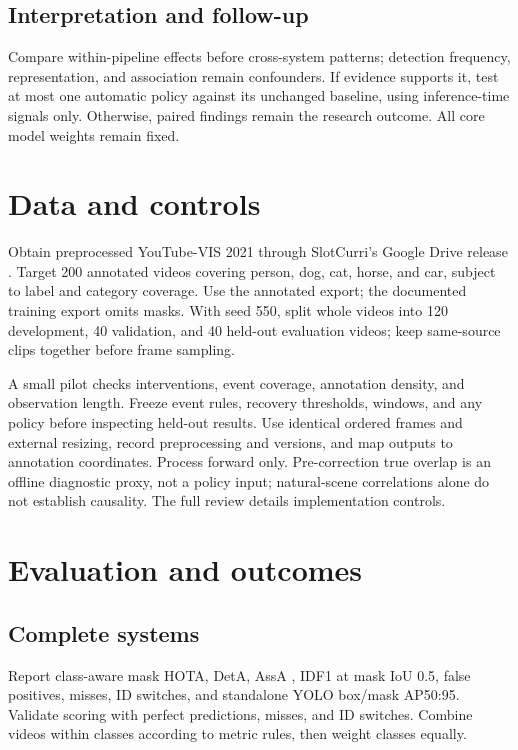 \documentclass{article}
\begin{document}
\subsection{Interpretation and follow-up}

Compare within-pipeline effects before cross-system patterns; detection frequency, representation, and association remain confounders. If evidence supports it, test at most one automatic policy against its unchanged baseline, using inference-time signals only. Otherwise, paired findings remain the research outcome. All core model weights remain fixed.

\section{Data and controls}

Obtain preprocessed YouTube-VIS 2021 through SlotCurri's Google Drive release \citep{moon2026}. Target 200 annotated videos covering person, dog, cat, horse, and car, subject to label and category coverage. Use the annotated export; the documented training export omits masks. With seed 550, split whole videos into 120 development, 40 validation, and 40 held-out evaluation videos; keep same-source clips together before frame sampling.

A small pilot checks interventions, event coverage, annotation density, and observation length. Freeze event rules, recovery thresholds, windows, and any policy before inspecting held-out results. Use identical ordered frames and external resizing, record preprocessing and versions, and map outputs to annotation coordinates. Process forward only. Pre-correction true overlap is an offline diagnostic proxy, not a policy input; natural-scene correlations alone do not establish causality. The full review details implementation controls.

\section{Evaluation and outcomes}

\subsection{Complete systems}

Report class-aware mask HOTA, DetA, AssA \citep{luiten2020}, IDF1 at mask IoU 0.5, false positives, misses, ID switches, and standalone YOLO box/mask AP50:95. Validate scoring with perfect predictions, misses, and ID switches. Combine videos within classes according to metric rules, then weight classes equally.
\end{document}
